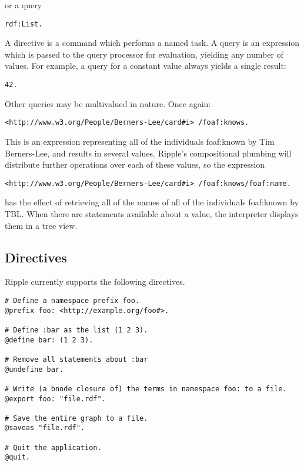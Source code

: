 \documentclass[runningheads]{llncs}
\begin{document}
or a query

\begin{verbatim}
rdf:List.
\end{verbatim}

A directive is a command which performs a named task.  A query is an expression which is passed to the query processor for evaluation, yielding any number of values.  For example, a query for a constant value always yields a single result:

\begin{verbatim}
42.
\end{verbatim}

Other queries may be multivalued in nature.  Once again:

\begin{verbatim}
<http://www.w3.org/People/Berners-Lee/card#i> /foaf:knows.
\end{verbatim}

This is an expression representing all of the individuals foaf:known by Tim
Berners-Lee, and results in several values.  Ripple's compositional plumbing
will distribute further operations over each of these values, so the expression

\begin{verbatim}
<http://www.w3.org/People/Berners-Lee/card#i> /foaf:knows/foaf:name.
\end{verbatim}

has the effect of retrieving all of the names of all of the individuals
foaf:known by TBL.  When there are statements available about a value, the
interpreter displays them in a tree view.


\subsection{Directives}

Ripple currently supports the following directives.
\newline

\begin{verbatim}
# Define a namespace prefix foo.
@prefix foo: <http://example.org/foo#>.

# Define :bar as the list (1 2 3).
@define bar: (1 2 3).

# Remove all statements about :bar
@undefine bar.

# Write (a bnode closure of) the terms in namespace foo: to a file.
@export foo: "file.rdf".

# Save the entire graph to a file.
@saveas "file.rdf".

# Quit the application.
@quit.
\end{verbatim}
\end{document}

